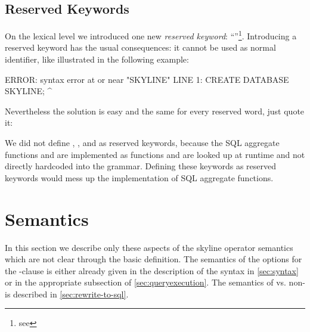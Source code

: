 \subsection{Reserved Keywords}
\label{sec:reservedkeywords}
On the lexical level we introduced one new \emph{reserved
keyword}: ``''\footnote{see
}. Introducing a reserved
keyword has the usual consequences: it cannot be used as normal
identifier, like illustrated in the following example:

\begin{interactive}
ERROR:  syntax error at or near "SKYLINE"
LINE 1: CREATE DATABASE SKYLINE;
                        ^
\end{interactive}
\noindent
Nevertheless the solution is easy and the same for every reserved
word, just quote it:
\begin{interactive}
\end{interactive}

We did not define , , and
 as reserved keywords, because the SQL aggregate
functions  and  are implemented as
functions and are looked up at runtime and not directly hardcoded into
the grammar. Defining these keywords as reserved keywords would mess
up the implementation of SQL aggregate functions.


\section{Semantics}
In this section we describe only these
aspects of the skyline operator semantics which are not clear through
the basic definition.  The semantics of the options for the
-clause is either already given in the description
of the syntax in \autoref{sec:syntax} or in the appropriate subsection
of \autoref{sec:queryexecution}.
The semantics of 
vs. non- is described in
\autoref{sec:rewrite-to-sql}.


%
%
%
%
%

